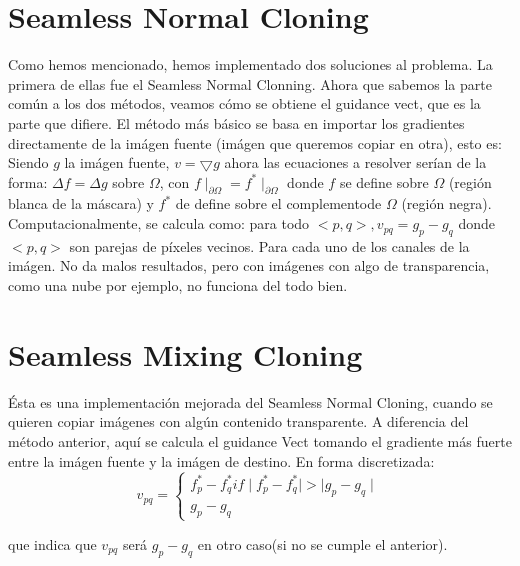 \documentclass[oneside]{article}
\begin{document}
\begin{multicols}{2}
\section{Seamless Normal Cloning}
Como hemos mencionado, hemos implementado dos soluciones al problema. La primera de ellas fue el Seamless Normal Clonning.
Ahora que sabemos la parte común a los dos métodos, veamos cómo se obtiene el guidance vect, que es la parte que difiere. \newline
El método más básico se basa en importar los gradientes directamente de la imágen fuente (imágen que queremos copiar en otra), esto es:
Siendo $g$ la imágen fuente, $v= \bigtriangledown g $ ahora las ecuaciones a resolver serían de la forma:
$\Delta f=\Delta g$  sobre $\Omega$, con $f\mid_{\partial \Omega}=f^{*}\mid_{\partial\Omega}$ donde $f$ se define sobre $\Omega$ (región blanca de la máscara)
y $f^{*}$ de define sobre el complementode $\Omega$ (región negra). \newline
Computacionalmente, se calcula como: \newline
para todo $<p,q>,v_{pq} =g_{p}-g_{q}$ donde $<p,q>$ son parejas de píxeles vecinos. Para cada uno de los canales de la imágen. \newline
No da malos resultados, pero con imágenes con algo de transparencia, como una nube por ejemplo, no funciona del todo bien.

\section{Seamless Mixing Cloning}
Ésta es una implementación mejorada del Seamless Normal Cloning, cuando se quieren copiar imágenes con algún contenido transparente.
A diferencia del método anterior, aquí se calcula el guidance Vect tomando el gradiente más fuerte entre la imágen fuente y la imágen de destino.
En forma discretizada: \newline
\[v_{pq}=\left\{\begin{matrix} f^{*}_{p}-f^{*}_{q} if \mid f^{*}_{p}-f^{*}_{q}\mid > \mid g_{p}-g_{q} \mid \\ g_{p}-g_{q} \end{matrix}\right.\]

que indica que $v_{pq}$ será $g_{p}-g_{q}$ en otro caso(si no se cumple el anterior).

\end{multicols}
\end{document}
